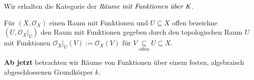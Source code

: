 Wir erhalten die Kategorie der $\emph{Räume mit Funktionen über K}$.
\begin{defn}
  \label{def:raeume-mit-fkt-offener-unterraum}
  Für $(X,\mathcal{O}_{X})$ einen Raum mit Funktionen und $U\subseteq X$ offen bezeichne $(U,\mathcal{O}_{X}|_{U})$ den
  Raum mit Funktionen gegeben durch den topologischen Raum $U$ mit
  Funktionen $\mathcal{O}_{X}|_{U}(V):=\mathcal{O}_{X}(V)$ für $V\underset{\text{offen}}{\subseteq}U\subseteq X$.
\end{defn}
\textbf{Ab jetzt} betrachten wir Räume von Funktionen über einem festen, algebraisch abgeschlossenen Grundkörper $k$.

